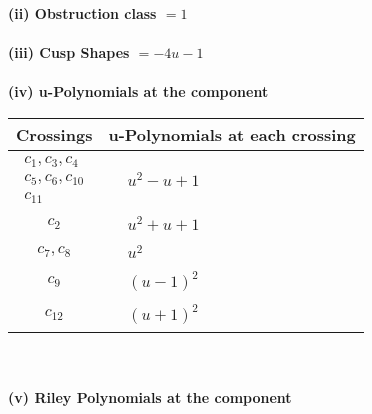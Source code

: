 \documentclass[1p]{elsarticle_modified}
\theoremstyle{definition}
\begin{document}
\flushleft \textbf{(ii) Obstruction class $= 1$}\\~\\
\flushleft \textbf{(iii) Cusp Shapes $= -4 u-1$}\\~\\
\newpage\renewcommand{\arraystretch}{1}
\flushleft \textbf{(iv) u-Polynomials at the component}\newline \\
\begin{tabular}{m{50pt}|m{274pt}}
Crossings & \hspace{64pt}u-Polynomials at each crossing \\
\hline $$\begin{aligned}c_{1},c_{3},c_{4}\\c_{5},c_{6},c_{10}\\c_{11}\end{aligned}$$&$\begin{aligned}
&u^2- u+1
\end{aligned}$\\
\hline $$\begin{aligned}c_{2}\end{aligned}$$&$\begin{aligned}
&u^2+u+1
\end{aligned}$\\
\hline $$\begin{aligned}c_{7},c_{8}\end{aligned}$$&$\begin{aligned}
&u^2
\end{aligned}$\\
\hline $$\begin{aligned}c_{9}\end{aligned}$$&$\begin{aligned}
&(u-1)^2
\end{aligned}$\\
\hline $$\begin{aligned}c_{12}\end{aligned}$$&$\begin{aligned}
&(u+1)^2
\end{aligned}$\\
\hline
\end{tabular}\\~\\
\newpage\renewcommand{\arraystretch}{1}
\flushleft \textbf{(v) Riley Polynomials at the component}\newline \\
\end{document}
